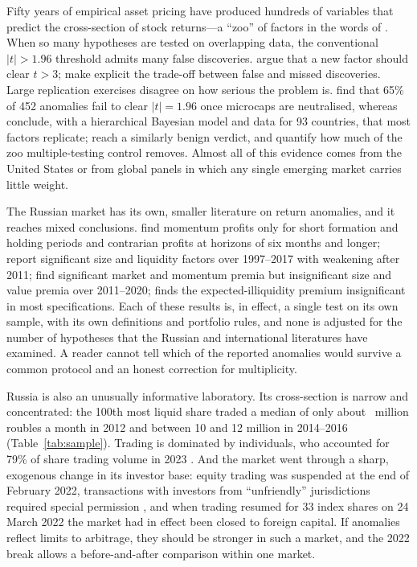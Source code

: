\documentclass[11pt]{article}
\begin{document}
Fifty years of empirical asset pricing have produced hundreds of variables that predict the cross-section of
stock returns---a ``zoo'' of factors in the words of \citet{cochrane2011discount}. When so many hypotheses are tested
on overlapping data, the conventional $|t|>1.96$ threshold admits many false discoveries. \citet{harvey2016cross}
argue that a new factor should clear $t>3$; \citet{harvey2020false} make explicit the trade-off between false and
missed discoveries. Large replication exercises disagree on how serious the problem is.
\citet{hou2020replicating} find that 65\% of 452 anomalies fail to clear $|t|=1.96$ once microcaps are neutralised,
whereas \citet{jensen2023replication} conclude, with a hierarchical Bayesian model and data for 93 countries, that
most factors replicate; \citet{chen2022open} reach a similarly benign verdict, and \citet{chordia2020anomalies}
quantify how much of the zoo multiple-testing control removes. Almost all of this evidence comes from the United
States or from global panels in which any single emerging market carries little weight.

The Russian market has its own, smaller literature on return anomalies, and it reaches mixed conclusions.
\citet{teplova2014momentum} find momentum profits only for short formation and holding periods and contrarian
profits at horizons of six months and longer; \citet{abramov2019pricing} report significant size and liquidity
factors over 1997--2017 with weakening after 2011; \citet{ovechkin2022econometric} find significant market and
momentum premia but insignificant size and value premia over 2011--2020; \citet{gurov2023illiquidity} finds the
expected-illiquidity premium insignificant in most specifications. Each of these results is, in effect, a single
test on its own sample, with its own definitions and portfolio rules, and none is adjusted for the number of
hypotheses that the Russian and international literatures have examined. A reader cannot tell which of the
reported anomalies would survive a common protocol and an honest correction for multiplicity.

Russia is also an unusually informative laboratory. Its cross-section is narrow and concentrated: the 100th most
liquid share traded a median of only about ~million roubles a month in 2012 and between 10 and 12
million in 2014--2016 (Table~\ref{tab:sample}). Trading is dominated by individuals, who accounted for 79\% of share trading
volume in 2023 \citep{moex2024retail}. And the market went through a sharp, exogenous change in its investor base:
equity trading was suspended at the end of February 2022, transactions with investors from ``unfriendly'' jurisdictions
required special permission \citep{decree81}, and when trading resumed for 33 index shares on 24 March 2022 \citep{cbr2022reopen}
the market had in effect been closed to foreign capital. If anomalies reflect limits to arbitrage, they should be stronger in such a
market, and the 2022 break allows a before-and-after comparison within one market.
\end{document}

